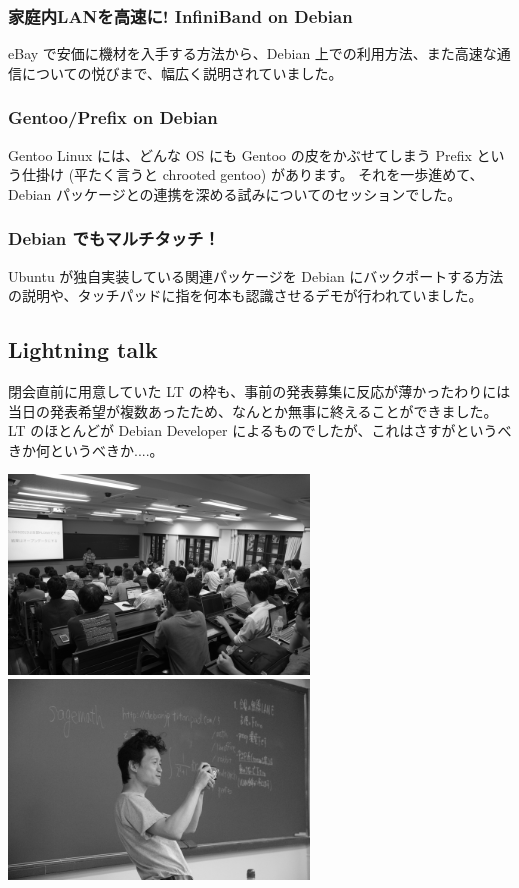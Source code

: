 \documentclass[mingoth,a4paper]{jsarticle}
\begin{document}
\subsubsection{家庭内LANを高速に! InfiniBand on Debian}

eBay で安価に機材を入手する方法から、Debian 上での利用方法、また高速な通信についての悦びまで、幅広く説明されていました。

\subsubsection{Gentoo/Prefix on Debian}

Gentoo Linux には、どんな OS にも Gentoo の皮をかぶせてしまう Prefix という仕掛け (平たく言うと chrooted gentoo) があります。
それを一歩進めて、Debian パッケージとの連携を深める試みについてのセッションでした。

\subsubsection{Debian でもマルチタッチ！}

Ubuntu が独自実装している関連パッケージを Debian にバックポートする方法の説明や、タッチパッドに指を何本も認識させるデモが行われていました。


\subsection{Lightning talk}
閉会直前に用意していた LT の枠も、事前の発表募集に反応が薄かったわりには当日の発表希望が複数あったため、なんとか無事に終えることができました。
LT のほとんどが Debian Developer によるものでしたが、これはさすがというべきか何というべきか....。

\includegraphics[width=8cm]{image201206/gum2012-lt_mono.jpg}
\includegraphics[width=8cm]{image201206/gum2012-closing_mono.jpg}
\end{document}
